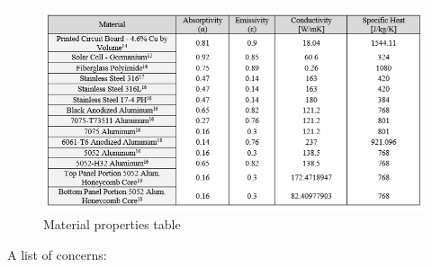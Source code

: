 \documentclass[final]{cubedoc}
\begin{document}
	\begin{figure}[h!]
		\centering
		\includegraphics[keepaspectratio, height=0.3\textheight, width=\textwidth]{docs/material_properties_table.png}
		\caption{Material properties table  \cite[p.115]{zotero-47}}
		\label{fig:my_label}
	\end{figure}
	
	A list of concerns:
	
\end{document}
